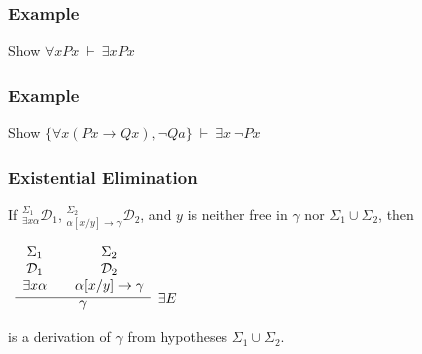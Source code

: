 \documentclass{beamer}
\theoremstyle{indentDefn} \newtheorem{defn}[]{Definition}
\begin{document}
\begin{frame}
	\frametitle{Example}
	
	Show $\forall x Px \ \vdash \ \exists x Px$
	
	\vspace{6cm}
	
	
\end{frame}

\begin{frame}
	\frametitle{Example}
	
	Show $\{\forall x (Px \rightarrow Qx), \lnot Qa\} \ \vdash \ \exists x \ \lnot Px$
	
	\vspace{6cm}
	
	
\end{frame}

\begin{frame}
	\frametitle{Existential Elimination}
	
	If $^{\Sigma_{1}}_{\exists x \alpha}\mathcal{D}_{1}$, $^{\Sigma_{2}}_{\alpha[x/y]\rightarrow\gamma}\mathcal{D}_{2}$, and $y$ is neither free in $\gamma$ nor $\Sigma_{1} \cup \Sigma_{2
	}$, then
	
	\begin{center}
	$\begin{array}{ c }
	
	\infer[\exists E]{\gamma}
	{
		\begin{array}{c} \Sigma_{1}  \\ \mathcal{D}_{1} \\ \exists x \alpha \end{array}
		& 
		\begin{array}{c} \Sigma_{2}  \\ \mathcal{D}_{2} \\ \alpha[x/y]\rightarrow\gamma \end{array}				
	}	
	
	\end{array}$
	\end{center}

	is a derivation of $\gamma$ from hypotheses $\Sigma_{1} \cup \Sigma_{2}$. 
	
	
\end{frame}
\end{document}
